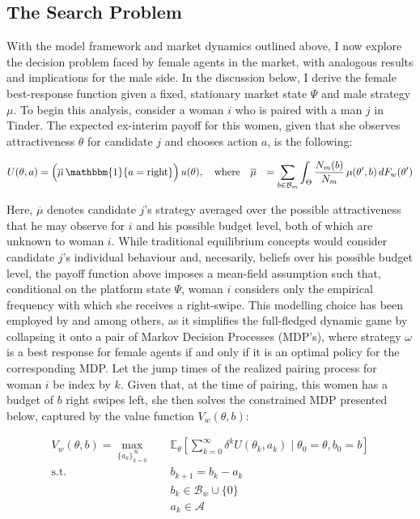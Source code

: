 \subsection{The Search Problem}\label{sec:section2.3}
With the model framework and market dynamics outlined above, I now explore the decision problem faced by female agents in the market, with analogous results and implications for the male side. In the discussion below, I derive the female best-response function given a fixed, stationary market state $\Psi$ and male strategy $\mu$. To begin this analysis, consider a woman $i$ who is paired with a man $j$ in Tinder. The expected ex-interim payoff for this women, given that she observes attractiveness $\theta$ for candidate $j$ and chooses action $a$, is the following:

\begin{equation*}
    \begin{aligned}
        U(\theta, a)&=\Big(\overline{\mu}\,\mathbbm{1}\{a=\text{right}\}\Big)\,u(\theta), \quad \text{where}\quad \overline{\mu} &= \sum_{b\in \mathcal{B}_m}\int_{\Theta}\frac{{N}_m(b)}{N_m}  \, \mu(\theta',b)\,dF_w(\theta')
    \end{aligned} 
\end{equation*}

Here, $\overline\mu$ denotes candidate $j$'s strategy averaged over the possible attractiveness that he may observe for $i$ and his possible budget level, both of which are unknown to woman $i$. While traditional equilibrium concepts would consider candidate $j$'s individual behaviour and, necesarily, beliefs over his possible budget level, the payoff function above imposes a mean-field assumption such that, conditional on the platform state $\Psi$, woman $i$ considers only the empirical frequency with which she receives a right-swipe. This modelling choice has been employed by \cite{immorlica2021designing} and \cite{iyer2014mean} among others, as it simplifies the full-fledged dynamic game by collapsing it onto a pair of Markov Decision Processes (MDP's), where strategy $\omega$ is a best response for female agents if and only if it is an optimal policy for the corresponding MDP. Let the jump times of the realized pairing process for woman $i$ be index by $k$. Given that, at the time of pairing, this women has a budget of $b$ right swipes left, she then solves the constrained MDP presented below, captured by the value function $V_w(\theta,b)$:

\begin{equation*}
    \begin{aligned} 
        V_w(\theta,b)=\max_{\{a_k\}^\infty_{k=0}} \quad & \mathbb{E}_{\theta}\left[\sum^\infty_{k=0} \delta^{k} U(\theta_k, a_k) \;|\; \theta_0=\theta, b_0=b\right]\\ 
        \textrm{s.t.} \quad & b_{k+1} = b_k -a_k \\
        & b_k\in \mathcal{B}_w \cup \{0\} \\
        & a_k\in \mathcal{A}  
    \end{aligned}
\end{equation*}

